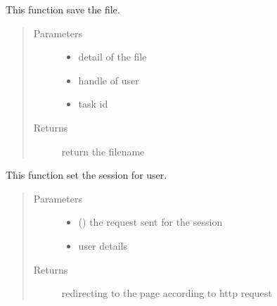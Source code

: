 \documentclass[letterpaper,10pt,english]{sphinxmanual}
\begin{document}

\begin{fulllineitems}
\label{\detokenize{janta:janta.viewhelper.save_file}}
This function save the file.
\begin{quote}\begin{description}
\item[{Parameters}] \leavevmode\begin{itemize}
\item {} 
 \textendash{} detail of the file

\item {} 
 \textendash{} handle of user

\item {} 
 \textendash{} task id

\end{itemize}

\item[{Returns}] \leavevmode
return the filename

\end{description}\end{quote}

\end{fulllineitems}


\begin{fulllineitems}
\label{\detokenize{janta:janta.viewhelper.set_session}}
This function set the session for user.
\begin{quote}\begin{description}
\item[{Parameters}] \leavevmode\begin{itemize}
\item {} 
 () \textendash{} the request sent for the session

\item {} 
 \textendash{} user details

\end{itemize}

\item[{Returns}] \leavevmode
redirecting to the page according to http request

\end{description}\end{quote}

\end{fulllineitems}
\end{document}
